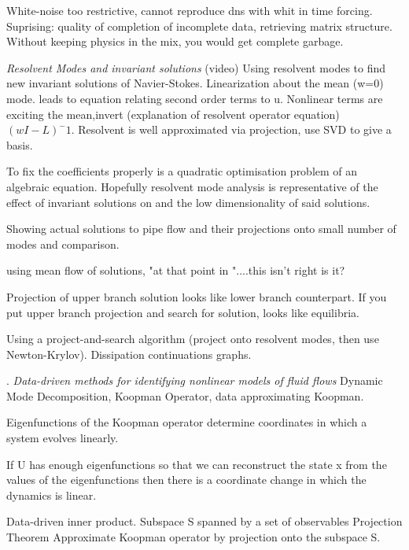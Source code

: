 \begin{description}
{\begin{description}
White-noise too restrictive, cannot reproduce dns with whit in time forcing.
Suprising: quality of completion of incomplete data, retrieving matrix structure.
Without keeping physics in the mix, you would get complete garbage.

\item[A. Sharma Talk]
\textit{Resolvent Modes and invariant solutions}
({video)}
Using resolvent modes to find new invariant solutions of Navier-Stokes.
Linearization about the mean (w=0) mode. leads to equation relating
second order terms to u.
Nonlinear terms are exciting the mean,invert (explanation of resolvent operator equation)
$(wI -L)^-1$. Resolvent is well approximated via projection, use SVD to give a basis.

To fix the coefficients properly is a quadratic optimisation problem of an algebraic
equation.
Hopefully resolvent mode analysis is representative of the effect of invariant
solutions on {\statesp} and the low dimensionality of said solutions.

Showing actual solutions to pipe flow and their projections onto small number
of modes and comparison.

using mean flow of solutions, "at that point in {\statesp}"....this isn't right is it?

Projection of upper branch solution looks like lower branch counterpart. If you put
upper branch projection and search for solution, looks like equilibria.

Using a project-and-search algorithm (project onto resolvent modes, then use Newton-Krylov).
Dissipation continuations graphs.

\item[Clancy Rowley]
.
\textit{Data-driven methods for identifying nonlinear models of fluid flows}
Dynamic Mode Decomposition, Koopman Operator, data approximating Koopman.

Eigenfunctions of the Koopman operator determine coordinates in which a system
evolves linearly.

If U has enough eigenfunctions so that we can reconstruct
the state x from the values of the eigenfunctions then
there is a coordinate change in which the dynamics is linear.

Data-driven inner product.
Subspace S spanned by a set of observables
Projection Theorem
Approximate Koopman operator by projection onto the subspace S.


\end{description}}
\end{description}
